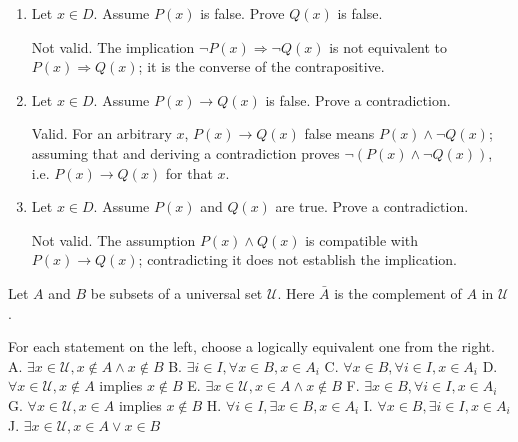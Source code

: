 \begin{enumerate}
\begin{enumerate}[label=\Alph*.]
    \item Let $x \in D$. Assume $P(x)$ is false. Prove $Q(x)$ is false.\\
    \begin{subanswer}
        Not valid. The implication $\lnot P(x)\Rightarrow\lnot Q(x)$ is not equivalent to $P(x)\Rightarrow Q(x)$; it is the converse of the contrapositive.
    \end{subanswer}

    \item Let $x \in D$. Assume $P(x) \rightarrow Q(x)$ is false. Prove a contradiction.\\
    \begin{subanswer}
        Valid. For an arbitrary $x$, $P(x)\rightarrow Q(x)$ false means $P(x)\land\lnot Q(x)$; assuming that and deriving a contradiction proves $\lnot(P(x)\land\lnot Q(x))$, i.e. $P(x)\rightarrow Q(x)$ for that $x$.
    \end{subanswer}

    \item Let $x \in D$. Assume $P(x)$ and $Q(x)$ are true. Prove a contradiction.\\
    \begin{subanswer}
        Not valid. The assumption $P(x)\land Q(x)$ is compatible with $P(x)\rightarrow Q(x)$; contradicting it does not establish the implication.
    \end{subanswer}
  \end{enumerate}



















  


  Let $A$ and $B$ be subsets of a universal set $\mathcal{U}$. Here $\bar{A}$ is the complement of $A$ in $\mathcal{U}$.

For each statement on the left, choose a logically equivalent one from the right.
A. $\exists x \in \mathcal{U}, x \notin A \wedge x \notin B$
B. $\exists i \in I, \forall x \in B, x \in A_i$
C. $\forall x \in B, \forall i \in I, x \in A_i$
D. $\forall x \in \mathcal{U}, x \notin A$ implies $x \notin B$
E. $\exists x \in \mathcal{U}, x \in A \wedge x \notin B$
F. $\exists x \in B, \forall i \in I, x \in A_i$
G. $\forall x \in \mathcal{U}, x \in A$ implies $x \notin B$
H. $\forall i \in I, \exists x \in B, x \in A_i$
I. $\forall x \in B, \exists i \in I, x \in A_i$
J. $\exists x \in \mathcal{U}, x \in A \vee x \in B$




\end{enumerate}
